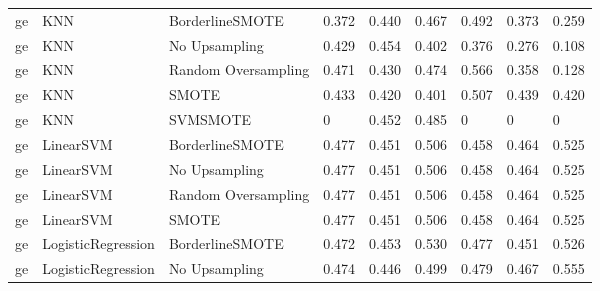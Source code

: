 \begin{tabular}{lllllllll}
      ge &                          KNN &     BorderlineSMOTE & 0.372 &                     0.440 &                 0.467 &                  0.492 &                                   0.373 &     0.259 \\
      ge &                          KNN &       No Upsampling & 0.429 &                     0.454 &                 0.402 &                  0.376 &                                   0.276 &     0.108 \\
      ge &                          KNN & Random Oversampling & 0.471 &                     0.430 &                 0.474 &                  0.566 &                                   0.358 &     0.128 \\
      ge &                          KNN &               SMOTE & 0.433 &                     0.420 &                 0.401 &                  0.507 &                                   0.439 &     0.420 \\
      ge &                          KNN &            SVMSMOTE &     0 &                     0.452 &                 0.485 &                      0 &                                       0 &         0 \\
      ge &                    LinearSVM &     BorderlineSMOTE & 0.477 &                     0.451 &                 0.506 &                  0.458 &                                   0.464 &     0.525 \\
      ge &                    LinearSVM &       No Upsampling & 0.477 &                     0.451 &                 0.506 &                  0.458 &                                   0.464 &     0.525 \\
      ge &                    LinearSVM & Random Oversampling & 0.477 &                     0.451 &                 0.506 &                  0.458 &                                   0.464 &     0.525 \\
      ge &                    LinearSVM &               SMOTE & 0.477 &                     0.451 &                 0.506 &                  0.458 &                                   0.464 &     0.525 \\
      ge &           LogisticRegression &     BorderlineSMOTE & 0.472 &                     0.453 &                 0.530 &                  0.477 &                                   0.451 &     0.526 \\
      ge &           LogisticRegression &       No Upsampling & 0.474 &                     0.446 &                 0.499 &                  0.479 &                                   0.467 &     0.555 \\

\end{tabular}
